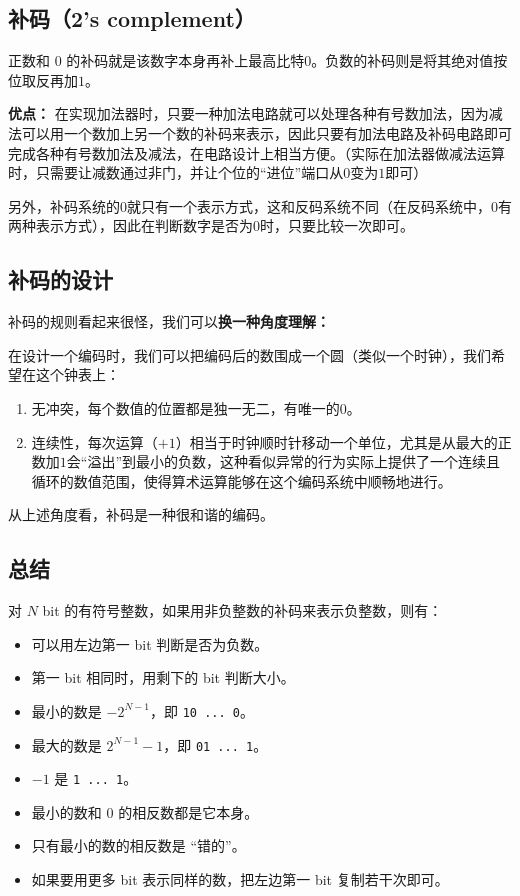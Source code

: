 \subsection{补码（2's complement）}

正数和 $0$ 的补码就是该数字本身再补上最高比特$0$。负数的补码则是将其绝对值按位取反再加$1$。

\textbf{优点：}
在实现加法器时，只要一种加法电路就可以处理各种有号数加法，因为减法可以用一个数加上另一个数的补码来表示，因此只要有加法电路及补码电路即可完成各种有号数加法及减法，在电路设计上相当方便。（实际在加法器做减法运算时，只需要让减数通过非门，并让个位的“进位”端口从$0$变为$1$即可）

另外，补码系统的$0$就只有一个表示方式，这和反码系统不同（在反码系统中，$0$有两种表示方式），因此在判断数字是否为$0$时，只要比较一次即可。


\subsection{补码的设计}

补码的规则看起来很怪，我们可以\textbf{换一种角度理解：}

在设计一个编码时，我们可以把编码后的数围成一个圆（类似一个时钟），我们希望在这个钟表上：
\begin{enumerate}
\item 
无冲突，每个数值的位置都是独一无二，有唯一的$0$。
\item 
连续性，每次运算（$+1$）相当于时钟顺时针移动一个单位，尤其是从最大的正数加$1$会“溢出”到最小的负数，这种看似异常的行为实际上提供了一个连续且循环的数值范围，使得算术运算能够在这个编码系统中顺畅地进行。
\end{enumerate}

从上述角度看，补码是一种很和谐的编码。


\subsection{总结}
对 $N$ bit 的有符号整数，如果用非负整数的补码来表示负整数，则有：
\begin{itemize}
\item 可以用左边第一 bit 判断是否为负数。
\item 第一 bit 相同时，用剩下的 bit 判断大小。
\item 最小的数是 $-2^{N-1}$，即 \verb`10 ... 0`。
\item 最大的数是 $2^{N-1}-1$，即 \verb`01 ... 1`。
\item $-1$ 是 \verb`1 ... 1`。
\item 最小的数和 $0$ 的相反数都是它本身。
\item 只有最小的数的相反数是 “错的”。
\item 如果要用更多 bit 表示同样的数，把左边第一 bit 复制若干次即可。
\end{itemize}
